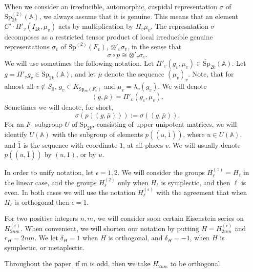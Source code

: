 \documentclass[12pts]{amsart}
\newcommand{\BA}{{\mathbb {A}}}
\newcommand{\Sp}{{\mathrm{Sp}}}
\begin{document}
When we consider an irreducible, automorphic, cuspidal representation $\sigma$ of $\Sp^{(2)}_{2k}(\BA)$, we always assume that it is genuine. This means that an element $C'\cdot \Pi'_v(I_{2k},\mu_v)$ acts by multiplication by $\Pi_v\mu_v$. The represntation $\sigma$ decomposes as a restricted tensor product of local irreducible genuine representations $\sigma_v$ of $\Sp^{(2)}(F_v)$, $\otimes'_v\sigma_v$, in the sense that 
\begin{equation}\label{1'.12}
\sigma\circ p\cong \otimes'_v\sigma_v.
\end{equation}
We will use sometimes the following  notation. Let $\Pi'_v(g_v,\mu_v)\in  \widetilde{\Sp}_{2k}(\BA)$. Let $g=\Pi'_vg_v\in \Sp_{2k}(\BA)$, and let $\bar{\mu}$ denote the sequence $(\mu_v)_v$. Note, that for almost all $v\notin S_0$, $g_v\in K_{\Sp_{2k}(F_v)}$ and $\mu_v=\lambda_v(g_v)$. We will denote
\begin{equation}\label{1'.13}
(g,\bar{\mu})=\Pi'_v(g_v,\mu_v).
\end{equation}
Sometimes we will denote, for short,
\begin{equation}\label{1'.14}
\sigma(p((g,\bar{\mu}))):=\sigma((g,\bar{\mu})).
\end{equation}
For an $F$- subgroup $U$ of $\Sp_{2k}$, consisting of upper unipotent matrices, we will identify $U(\BA)$ with the subgroup of elements $p((u,\bar{1}))$, where $u\in U(\BA)$, and $\bar{1}$ is the sequence with coordinate $1$, at all places $v$. We will usually denote $p((u,\bar{1}))$ by $(u,1)$, or by $u$.

In order to unify notation, let $\epsilon=1,2$. We will consider the groups $H_\ell^{(1)}=H_\ell$ in the linear case, and the groups $H_\ell^{(2)}$ only when $H_\ell$ is symplectic, and then $\ell$ is even. In both cases we will use the notation $H^{(\epsilon)}_\ell$ with the agreement that when $H_\ell$ is orthogonal then $\epsilon=1$. 

For two positive integers $n, m$, we will consider soon certain Eisenstein series on $H^{(\epsilon)}_{2nm}$. When convenient,
we will shorten our notation by putting $H=H^{(\epsilon)}_{2nm}$ and
$r_H=2nm$. We let $\delta_H=1$ when $H$ is orthogonal, and
$\delta_H=-1$, when $H$ is symplectic, or metaplectic.

Throughout the paper, if $m$ is odd, then we take $H_{2nm}$ to be orthogonal.  
\end{document}
